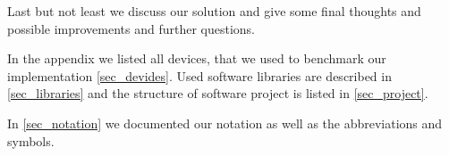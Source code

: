 Last but not least we discuss our solution and give some final thoughts and possible improvements and further questions.

In the appendix we listed all devices, that we used to benchmark our implementation \ref{sec_devides}. Used software libraries are described in \ref{sec_libraries} and the structure of software project is listed in \ref{sec_project}.

In \ref{sec_notation} we documented our notation as well as the abbreviations and symbols. 
